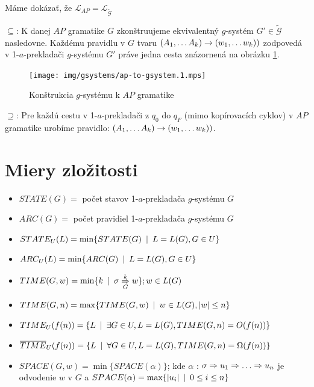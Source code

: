 \begin{dokaz}
Máme dokázať, že
$\mathcal{L}_{AP}=\mathcal{L}_{\tilde{\mathcal{G}}}$
\begin{description}
\item{$\subseteq$:} K danej $AP$ gramatike $G$ zkonštruujeme ekvivalentný $g$-systém
$G'\in\tilde{\mathcal{G}}$ nasledovne. Každému pravidlu v $G$
tvaru $(A_1,\dots A_k)\rightarrow (w_1,\dots w_k))$ zodpovedá v
1-$a$-prekladači $g$-systému $G'$ práve jedna cesta znázornená na
obrázku \ref{fig:ap-to-gsystem}.

\begin{figure}[!ht]
    \centering
    \texttt{[image: img/gsystems/ap-to-gsystem.1.mps]}
    \caption{Konštrukcia $g$-systému k $AP$ gramatike}
    \label{fig:ap-to-gsystem}
\end{figure}

\item{$\supseteq$:} Pre každú cestu v 1-$a$-prekladači z $q_0$ do $q_F$
(mimo kopírovacích cyklov) v $AP$ gramatike urobíme pravidlo:
$(A_1,\dots A_k)\rightarrow (w_1,\dots w_k))$.
\end{description}
\end{dokaz}

\section{Miery zložitosti}

\begin{itemize}
\item $STATE(G)=$ počet stavov 1-$a$-prekladača $g$-systému $G$
\item $ARC(G)=$ počet pravidiel 1-$a$-prekladača $g$-systému $G$
\item $STATE_U(L)=\min\{ STATE(G)\enspace |\enspace L=L(G), G\in U\}$
\item $ARC_U(L)=\min\{ ARC(G)\enspace |\enspace L=L(G), G\in U\}$
\item $TIME(G,w)=\min\{ k\enspace |\enspace\sigma\overset{k}{\underset{G}{\Rightarrow}} w\}; w\in L(G)$
\item $TIME(G,n)=\max\{ TIME(G,w)\enspace |\enspace w\in L(G), |w|\leq n\}$
\item $TIME_U(f(n))=\{ L \enspace |\enspace \exists G\in U, L=L(G), TIME(G,n)=O(f(n))\}$
\item $\overline{TIME}_U(f(n))=\{ L\enspace |\enspace\forall G\in U, L=L(G), TIME(G,n)=\Omega(f(n))\}$
\item $SPACE(G,w)=\min\{ SPACE(\alpha )\}$; kde $\alpha$ : $\sigma\Ra u_1\Ra\dots\Ra u_n$ je odvodenie $w$ v $G$
a $SPACE(\alpha)=\max\{|u_i|\enspace |\enspace 0\leq i\leq n\}$
\end{itemize}

